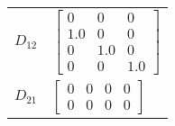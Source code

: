 \begin{tabular}{cl}
 $D_{12}$ & $\left[\begin{matrix}0 & 0 & 0\\1.0 & 0 & 0\\0 & 1.0 & 0\\0 & 0 & 1.0\end{matrix}\right]$                                                                 \\
 $D_{21}$ & $\left[\begin{matrix}0 & 0 & 0 & 0\\0 & 0 & 0 & 0\end{matrix}\right]$                                                                                     \\
\hline
\end{tabular}